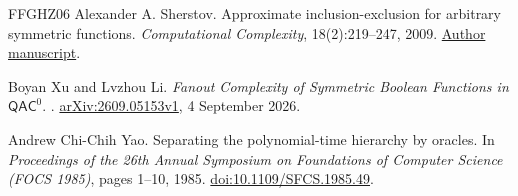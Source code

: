 \begin{thebibliography}{FFGHZ06}
Alexander A. Sherstov.
\newblock Approximate inclusion-exclusion for arbitrary symmetric functions.
\newblock \emph{Computational Complexity}, 18(2):219--247, 2009.
\newblock \href{https://web.cs.ucla.edu/~sherstov/pdf/incl-excl.pdf}{Author manuscript}.

Boyan Xu and Lvzhou Li.
\newblock \emph{Fanout Complexity of Symmetric Boolean Functions in
$\mathsf{QAC}^0$}.
. \href{https://arxiv.org/abs/2609.05153v1}{arXiv:2609.05153v1},
4 September 2026.

Andrew Chi-Chih Yao.
\newblock Separating the polynomial-time hierarchy by oracles.
\newblock In \emph{Proceedings of the 26th Annual Symposium on Foundations
of Computer Science (FOCS 1985)}, pages 1--10, 1985.
\newblock \href{https://doi.org/10.1109/SFCS.1985.49}{doi:10.1109/SFCS.1985.49}.

\end{thebibliography}
